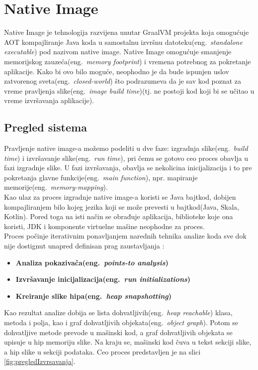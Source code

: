 \documentclass[a4paper]{article}
\begin{document}
\section{Native Image}
\label{sec:native_image}
Native Image je tehnologija razvijena unutar GraalVM projekta koja omogućuje AOT kompajliranje Java koda u samostalnu izvršnu datoteku(eng.~{\em standalone executable}) pod nazivom native image.
Native Image omogućuje smanjenje memorijskog zauzeća(eng.~{\em memory footprint}) i vremena potrebnog za pokretanje aplikacije. Kako bi ovo bilo moguće, neophodno je da bude ispunjen uslov zatvorenog sveta(eng.~{\em closed-world}) što podrazumeva da je sav kod poznat za vreme pravljenja slike(eng.~{\em image build time})(tj. ne postoji kod koji bi se učitao u vreme izvršavanja aplikacije).


\subsection{Pregled sistema}
Pravljenje native image-a možemo podeliti u dve faze: izgradnja slike(eng.~{\em build time}) i izvršavanje slike(eng.~{\em run time}), pri čemu se gotovo ceo proces obavlja u fazi izgradnje slike. U fazi izvršavanja, obavlja se nekolicina inicijalizacija i to pre pokretanja glavne funkcije(eng.~{\em main function}), npr. mapiranje memorije(eng.~{\em memory-mapping}). \\
\indent Kao ulaz za proces izgradnje native image-a koristi se Java bajtkod, dobijen kompajliranjem bilo kojeg jezika koji se može prevesti u bajtkod(Java, Skala, Kotlin). Pored toga na isti način se obrađuje aplikacija, biblioteke koje ona koristi, JDK i komponente virtuelne mašine neophodne za proces. \\
\indent Proces počinje iterativnim ponavljanjem narednih tehnika analize koda sve dok nije dostignut unapred definisan prag zaustavljanja \cite{PregledSistema}:
    \begin{itemize}
        \item \textbf{Analiza pokazivača(eng.~{\em points-to analysis})}
        \item \textbf{Izvršavanje inicijalizacija(eng.~{\em run initializations})}
        \item \textbf{Kreiranje slike hipa(eng.~{\em heap snapshotting})}
    \end{itemize}
Kao rezultat analize dobija se lista dohvatljivih(eng.~{\em heap reachable}) klasa, metoda i polja, kao i graf dohvatljivih objekata(eng.~{\em object graph}). Potom se dohvatljive metode prevode u mašinski kod, a graf dohvatljivih objekata se upisuje u hip memoriju slike. Na kraju se, mašinski kod čuva u tekst sekciji slike, a hip slike u sekciji podataka. Ceo proces predstavljen je na slici  \ref{fig:pregledIzvrsavanja}. 
\end{document}
